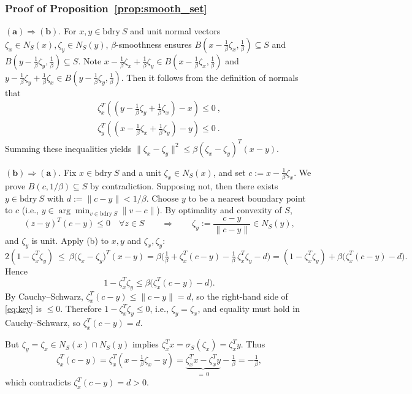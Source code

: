 \documentclass[sn-mathphys,Numbered]{sn-jnl}%
\newcommand{\bdry}{\mathrm{bdry\ }}
\begin{document}
\begin{appendices}
{\subsubsection{Proof of Proposition~\ref{prop:smooth_set}}\label{pf:smooth_set}
 $\mathbf{(a) \Rightarrow (b)}$.
For $x,y \in \bdry S$ and unit normal vectors $\zeta_x \in N_S(x), \zeta_y \in N_S(y)$, $\beta$-smoothness ensures $B(x-\frac{1}{\beta}\zeta_x, \frac{1}{\beta}) \subseteq S$ and $B(y-\frac{1}{\beta}\zeta_y, \frac{1}{\beta}) \subseteq S$. Note $x-\frac{1}{\beta}\zeta_x+\frac{1}{\beta}\zeta_y \in B(x-\frac{1}{\beta}\zeta_x, \frac{1}{\beta})$ and $y-\frac{1}{\beta}\zeta_y+\frac{1}{\beta}\zeta_x \in B(y-\frac{1}{\beta}\zeta_y, \frac{1}{\beta})$. Then it follows from the definition of normals that
\begin{align*}
    \zeta_x^T\left(\left(y-\frac{1}{\beta}\zeta_y+\frac{1}{\beta}\zeta_x\right)-x\right) \leq 0 \ , \\
    \zeta_y^T\left(\left(x-\frac{1}{\beta}\zeta_x+\frac{1}{\beta}\zeta_y\right)-y\right) \leq 0 \ . 
\end{align*}
Summing these inequalities yields $\|\zeta_x-\zeta_y\|^2 \leq \beta(\zeta_x-\zeta_y)^T(x-y)$.

\noindent $\mathbf{(b) \Rightarrow (a)}$.
Fix $x\in\bdry S$ and a unit $\zeta_x\in N_S(x)$, and set $c:=x-\frac1\beta \zeta_x$.
We prove $B(c,1/\beta)\subseteq S$ by contradiction. Supposing not, then there exists
$y\in\bdry S$ with $d:=\|c-y\|<1/\beta$. Choose $y$ to be a nearest boundary point to $c$
(i.e., $y\in\arg\min_{v\in\bdry S}\|v-c\|$). By optimality and convexity of $S$,
\[
(z-y)^T(c-y)\leq 0\quad\forall z\in S\qquad\Rightarrow\qquad \zeta_y:=\frac{c-y}{\|c-y\|}\in N_S(y),
\]
and $\zeta_y$ is unit. Apply (b) to $x,y$ and $\zeta_x,\zeta_y$:
\[
2(1-\zeta_x^T\zeta_y)\ \le\ \beta\big(\zeta_x-\zeta_y\big)^T(x-y)
= \beta\Big(\tfrac1\beta+\zeta_x^T(c-y)-\tfrac1\beta\,\zeta_x^T\zeta_y-d\Big)
= (1-\zeta_x^T\zeta_y)+\beta\big(\zeta_x^T(c-y)-d\big).
\]
Hence
\begin{equation}\label{eq:key}
1-\zeta_x^T\zeta_y \leq \beta\big(\zeta_x^T(c-y)-d\big).
\end{equation}
By Cauchy--Schwarz, $\zeta_x^T(c-y)\le\|c-y\|=d$, so the right-hand side of \eqref{eq:key} is
$\le 0$. Therefore $1-\zeta_x^T\zeta_y\le 0$, i.e., $\zeta_y=\zeta_x$, and
equality must hold in Cauchy--Schwarz, so $\zeta_x^T(c-y)=d$.

But $\zeta_y=\zeta_x\in N_S(x)\cap N_S(y)$ implies $\zeta_x^T x=\sigma_S(\zeta_x)=\zeta_x^T y$.
Thus
\[
\zeta_x^T(c-y)=\zeta_x^T(x-\tfrac1\beta\zeta_x-y)
= \underbrace{\zeta_x^T x-\zeta_x^T y}_{=\,0}-\tfrac1\beta=-\tfrac1\beta,
\]
which contradicts $\zeta_x^T(c-y)=d>0$.

}
\end{appendices}
\end{document}
